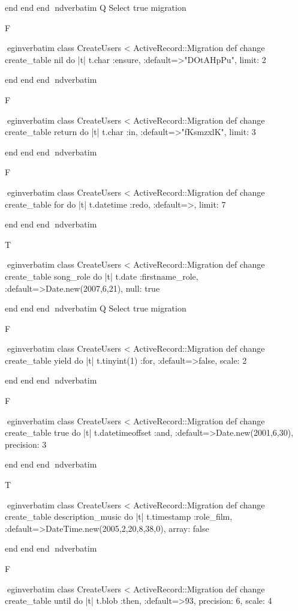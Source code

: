     end 
  end 
end
nd{verbatim}
Q
 Select true migration

F

egin{verbatim}
 class CreateUsers < ActiveRecord::Migration 
  def change 
    create_table nil do |t| 
      t.char :ensure, :default=>"DOtAHpPu", limit: 2
    
    end 
  end 
end
nd{verbatim}

F

egin{verbatim}
 class CreateUsers < ActiveRecord::Migration 
  def change 
    create_table return do |t| 
      t.char :in, :default=>"fKsmzxlK", limit: 3
    
    end 
  end 
end
nd{verbatim}

F

egin{verbatim}
 class CreateUsers < ActiveRecord::Migration 
  def change 
    create_table for do |t| 
      t.datetime :redo, :default=>, limit: 7
    
    end 
  end 
end
nd{verbatim}

T

egin{verbatim}
 class CreateUsers < ActiveRecord::Migration 
  def change 
    create_table song_role do |t| 
      t.date :firstname_role, :default=>Date.new(2007,6,21), null: true
    
    end 
  end 
end
nd{verbatim}
Q
 Select true migration

F

egin{verbatim}
 class CreateUsers < ActiveRecord::Migration 
  def change 
    create_table yield do |t| 
      t.tinyint(1) :for, :default=>false, scale: 2
    
    end 
  end 
end
nd{verbatim}

F

egin{verbatim}
 class CreateUsers < ActiveRecord::Migration 
  def change 
    create_table true do |t| 
      t.datetimeoffset :and, :default=>Date.new(2001,6,30), precision: 3
    
    end 
  end 
end
nd{verbatim}

T

egin{verbatim}
 class CreateUsers < ActiveRecord::Migration 
  def change 
    create_table description_music do |t| 
      t.timestamp :role_film, :default=>DateTime.new(2005,2,20,8,38,0), array: false
    
    end 
  end 
end
nd{verbatim}

F

egin{verbatim}
 class CreateUsers < ActiveRecord::Migration 
  def change 
    create_table until do |t| 
      t.blob :then, :default=>93, precision: 6, scale: 4
    
